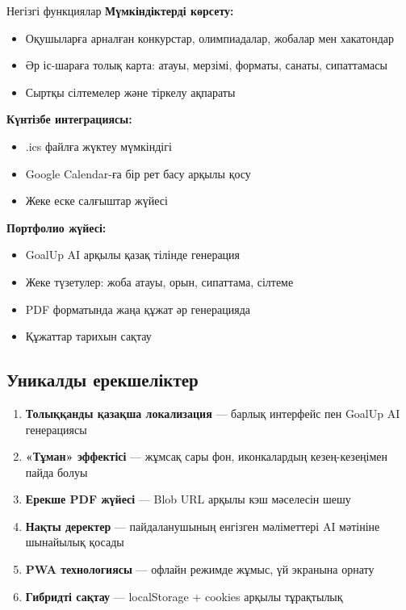 \documentclass[12pt,a4paper]{article}
\begin{document}
\begin{featurebox}{Негізгі функциялар}
\textbf{Мүмкіндіктерді көрсету:}
\begin{itemize}
    \item Оқушыларға арналған конкурстар, олимпиадалар, жобалар мен хакатондар
    \item Әр іс-шараға толық карта: атауы, мерзімі, форматы, санаты, сипаттамасы
    \item Сыртқы сілтемелер және тіркелу ақпараты
\end{itemize}

\textbf{Күнтізбе интеграциясы:}
\begin{itemize}
    \item .ics файлға жүктеу мүмкіндігі
    \item Google Calendar-ға бір рет басу арқылы қосу
    \item Жеке еске салғыштар жүйесі
\end{itemize}

\textbf{Портфолио жүйесі:}
\begin{itemize}
    \item GoalUp AI арқылы қазақ тілінде генерация
    \item Жеке түзетулер: жоба атауы, орын, сипаттама, сілтеме
    \item PDF форматында жаңа құжат әр генерацияда
    \item Құжаттар тарихын сақтау
\end{itemize}
\end{featurebox}

\subsection{Уникалды ерекшеліктер}

\begin{enumerate}[leftmargin=*]
    \item \textbf{Толыққанды қазақша локализация} — барлық интерфейс пен GoalUp AI генерациясы
    \item \textbf{«Тұман» эффектісі} — жұмсақ сары фон, иконкалардың кезең-кезеңімен пайда болуы
    \item \textbf{Ерекше PDF жүйесі} — Blob URL арқылы кэш мәселесін шешу
    \item \textbf{Нақты деректер} — пайдаланушының енгізген мәліметтері AI мәтініне шынайылық қосады
    \item \textbf{PWA технологиясы} — офлайн режимде жұмыс, үй экранына орнату
    \item \textbf{Гибридті сақтау} — localStorage + cookies арқылы тұрақтылық
\end{enumerate}
\end{document}
